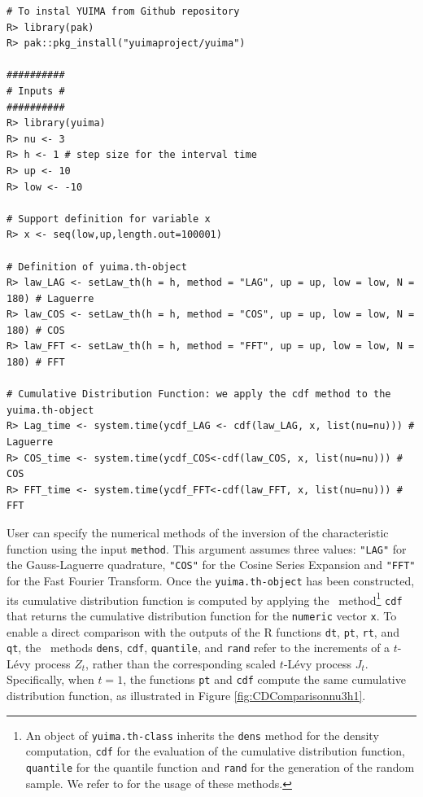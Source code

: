 \begin{verbatim}
# To instal YUIMA from Github repository
R> library(pak)
R> pak::pkg_install("yuimaproject/yuima")

##########
# Inputs #
##########
R> library(yuima)
R> nu <- 3
R> h <- 1 # step size for the interval time
R> up <- 10
R> low <- -10

# Support definition for variable x
R> x <- seq(low,up,length.out=100001)

# Definition of yuima.th-object
R> law_LAG <- setLaw_th(h = h, method = "LAG", up = up, low = low, N = 180) # Laguerre
R> law_COS <- setLaw_th(h = h, method = "COS", up = up, low = low, N = 180) # COS
R> law_FFT <- setLaw_th(h = h, method = "FFT", up = up, low = low, N = 180) # FFT

# Cumulative Distribution Function: we apply the cdf method to the yuima.th-object
R> Lag_time <- system.time(ycdf_LAG <- cdf(law_LAG, x, list(nu=nu))) # Laguerre
R> COS_time <- system.time(ycdf_COS<-cdf(law_COS, x, list(nu=nu))) # COS
R> FFT_time <- system.time(ycdf_FFT<-cdf(law_FFT, x, list(nu=nu))) # FFT
\end{verbatim}

User can specify the numerical methods of the inversion of the characteristic function using the input \texttt{method}. This argument assumes three values: \texttt{"LAG"} for the Gauss-Laguerre quadrature, \texttt{"COS"} for the Cosine Series Expansion and \texttt{"FFT"} for the Fast Fourier Transform. Once the \texttt{yuima.th-object} has been constructed, its cumulative distribution function is computed by applying the  ~method\footnote{An object of \texttt{yuima.th-class} inherits the \texttt{dens} method for the density computation, \texttt{cdf} for the evaluation of the cumulative distribution function, \texttt{quantile} for the quantile function and \texttt{rand} for the generation of the random sample. We refer to \citet{Masuda2022} for the usage of these methods.} \texttt{cdf} that returns the cumulative distribution function for the \texttt{numeric} vector \texttt{x}. To enable a direct comparison with the outputs of the R functions \texttt{dt}, \texttt{pt}, \texttt{rt}, and \texttt{qt}, the ~methods \texttt{dens}, \texttt{cdf}, \texttt{quantile}, and \texttt{rand} refer to the increments of a \(t\)-Lévy process \(Z_t\), rather than the corresponding scaled \(t\)-Lévy process \(J_t\). Specifically, when \(t = 1\), the functions \texttt{pt} and \texttt{cdf} compute the same cumulative distribution function, as illustrated in Figure \ref{fig:CDComparisonnu3h1}.

